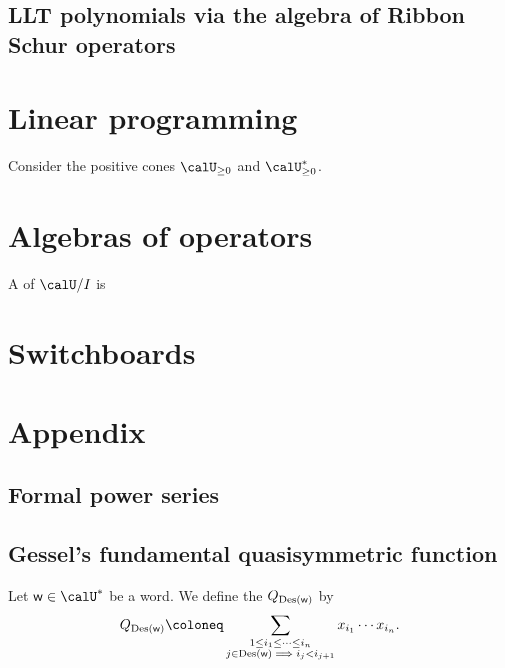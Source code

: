 \documentclass{article}
\newcommand*\Des{\operatorname{Des}}
\begin{document}
\subsection{LLT polynomials via the algebra of Ribbon Schur operators}

\section{Linear programming}

Consider the positive cones $\calU_{\geq 0}$ and $\calU^\ast_{\geq 0}$.


\section{Algebras of operators}

\begin{definition}
    A  of $\calU/I$ is
\end{definition}

\section{Switchboards}

\section{Appendix}

\subsection{Formal power series}

\begin{corollary}
\end{corollary}

\begin{proposition}

\end{proposition}

\subsection{Gessel's fundamental quasisymmetric function}

\begin{definition}
    Let ${\sf w} \in \calU^\ast$ be a word.
    We define the  $Q_{\Des(\sf w)}$ by
    \[
        Q_{\Des(\sf w)}
        \coloneq
        \sum_{
            \substack{
                1 \leq i_1 \leq \cdots \leq i_n \\
                j \in \Des({\sf w}) \implies i_j < i_{j+1}
            }
        }
        x_{i_1} \cdots x_{i_n}.
    \]
\end{definition}
\end{document}
